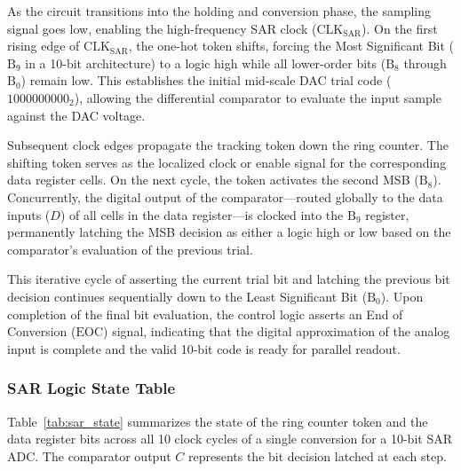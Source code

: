 As the circuit transitions into the holding and conversion phase, the sampling signal goes low,
enabling the high-frequency SAR clock ($\mathrm{CLK}_{\mathrm{SAR}}$). On the first rising
edge of $\mathrm{CLK}_{\mathrm{SAR}}$, the one-hot token shifts, forcing the Most Significant
Bit ($\mathrm{B}_9$ in a 10-bit architecture) to a logic high while all lower-order bits
($\mathrm{B}_8$ through $\mathrm{B}_0$) remain low. This establishes the initial mid-scale DAC
trial code ($1000000000_2$), allowing the differential comparator to evaluate the input sample
against the DAC voltage.

Subsequent clock edges propagate the tracking token down the ring counter. The shifting token
serves as the localized clock or enable signal for the corresponding data register cells. On
the next cycle, the token activates the second MSB ($\mathrm{B}_8$). Concurrently, the digital
output of the comparator---routed globally to the data inputs ($D$) of all cells in the data
register---is clocked into the $\mathrm{B}_9$ register, permanently latching the MSB decision
as either a logic high or low based on the comparator's evaluation of the previous trial.

This iterative cycle of asserting the current trial bit and latching the previous bit decision
continues sequentially down to the Least Significant Bit ($\mathrm{B}_0$). Upon completion of
the final bit evaluation, the control logic asserts an End of Conversion ($\mathrm{EOC}$)
signal, indicating that the digital approximation of the analog input is complete and the valid
10-bit code is ready for parallel readout.

\subsubsection{SAR Logic State Table}

Table~\ref{tab:sar_state} summarizes the state of the ring counter token and the data register
bits across all 10 clock cycles of a single conversion for a 10-bit SAR ADC. The comparator
output $C$ represents the bit decision latched at each step.

